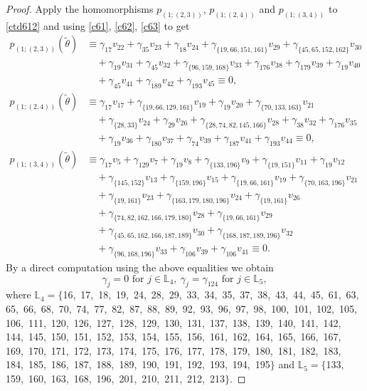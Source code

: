 \documentclass[reqno]{amsart}
\theoremstyle{plain}
\theoremstyle{definition}
\theoremstyle{plain}
\theoremstyle{definition}
\numberwithin{equation}{section}
\begin{document}
\begin{proof}
Apply the homomorphisms $p_{(1;(2,3))}$, $p_{(1;(2,4))}$ and $p_{(1;(3,4))}$ to \eqref{ctd612} and using \eqref{c61}, \eqref{c62}, \eqref{c63} to get
\begin{align*}
p_{(1;(2,3))}(\widetilde\theta) &\equiv \gamma_{17}v_{22} + \gamma_{35}v_{23} + \gamma_{18}v_{24} + \gamma_{\{19,66,151,161\}}v_{29} + \gamma_{\{45,65,152,162\}}v_{30}\\ 
&\quad + \gamma_{19}v_{31} + \gamma_{45}v_{32} + \gamma_{\{96,159,168\}}v_{33} + \gamma_{176}v_{38} + \gamma_{179}v_{39} + \gamma_{19}v_{40}\\ 
&\quad + \gamma_{45}v_{41} + \gamma_{189}v_{42} + \gamma_{193}v_{45} \equiv 0,\\
p_{(1;(2,4))}(\widetilde\theta) &\equiv \gamma_{17}v_{17} + \gamma_{\{19,66,129,161\}}v_{19} + \gamma_{19}v_{20} + \gamma_{\{70,133,163\}}v_{21}\\ 
&\quad + \gamma_{\{28,33\}}v_{24} + \gamma_{29}v_{26} + \gamma_{\{28,74,82,145,166\}}v_{28} + \gamma_{38}v_{32} + \gamma_{176}v_{35}\\ 
&\quad + \gamma_{19}v_{36} + \gamma_{180}v_{37} + \gamma_{74}v_{39} + \gamma_{187}v_{41} + \gamma_{193}v_{44} \equiv 0,\\
p_{(1;(3,4))}(\widetilde\theta) &\equiv \gamma_{17}v_{5} + \gamma_{129}v_{7} + \gamma_{19}v_{8} + \gamma_{\{133,196\}}v_{9} + \gamma_{\{19,151\}}v_{11} + \gamma_{19}v_{12}\\ 
&\quad + \gamma_{\{145,152\}}v_{13} + \gamma_{\{159,196\}}v_{15} + \gamma_{\{19,66,161\}}v_{19} + \gamma_{\{70,163,196\}}v_{21}\\ 
&\quad + \gamma_{\{19,161\}}v_{23} + \gamma_{\{163,179,180,196\}}v_{24} + \gamma_{\{19,161\}}v_{26}\\ 
&\quad + \gamma_{\{74,82,162,166,179,180\}}v_{28} + \gamma_{\{19,66,161\}}v_{29}\\ 
&\quad + \gamma_{\{45,65,162,166,187,189\}}v_{30} + \gamma_{\{168,187,189,196\}}v_{32}\\ 
&\quad + \gamma_{\{96,168,196\}}v_{33} + \gamma_{106}v_{39} + \gamma_{106}v_{41} \equiv 0.  
\end{align*}
By a direct computation using the above equalities we obtain
\begin{equation}\label{c64}
\gamma_j = 0 \mbox{ for } j \in \mathbb L_4,\  \gamma_j= \gamma_{124} \mbox{ for } j \in \mathbb L_5,
\end{equation}
where $\mathbb L_4 = \{$16,\, 17,\, 18,\, 19,\, 24,\, 28,\, 29,\, 33,\, 34,\, 35,\, 37,\, 38,\, 43,\, 44,\, 45,\, 61,\, 63,\, 65,\, 66,\, 68,\, 70,\, 74,\, 77,\, 82,\, 87,\, 88,\, 89,\, 92,\, 93,\, 96,\, 97,\, 98,\, 100,\, 101,\, 102,\, 105,\, 106,\, 111,\, 120,\, 126,\, 127,\, 128,\, 129,\, 130,\, 131,\, 137,\, 138,\, 139,\, 140,\, 141,\, 142,\, 144,\, 145,\, 150,\, 151,\, 152,\, 153,\, 154,\, 155,\, 156,\, 161,\, 162,\, 164,\, 165,\, 166,\, 167,\, 169,\, 170,\, 171,\, 172,\, 173,\, 174,\, 175,\, 176,\, 177,\, 178,\, 179,\, 180,\, 181,\, 182,\, 183,\, 184,\, 185,\, 186,\, 187,\, 188,\, 189,\, 190,\, 191,\, 192,\, 193,\, 194,\, 195$\}$ and $\mathbb L_5 = \{$133,\, 159,\, 160,\, 163,\, 168,\, 196,\, 201,\, 210,\, 211,\, 212,\, 213$\}$. 


\end{proof}
\end{document}
